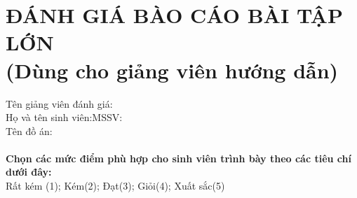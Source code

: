 \section*{ĐÁNH GIÁ BÀO CÁO BÀI TẬP LỚN\\\fontsize{14pt}{0pt}\selectfont \vspace{4pt}\textnormal{(Dùng cho giảng viên hướng dẫn)}}
\thispagestyle{empty}
\vspace{-16pt}
\hspace{-1cm}Tên giảng viên đánh giá:\dotfill\\
Họ và tên sinh viên:\dotfill MSSV:\dotfill\\
Tên đồ án:\dotfill\\
\\
\textbf{Chọn các mức điểm phù hợp cho sinh viên trình bày theo các tiêu chí dưới đây:}\\
Rất kém (1); Kém(2); Đạt(3); Giỏi(4); Xuất sắc(5)
